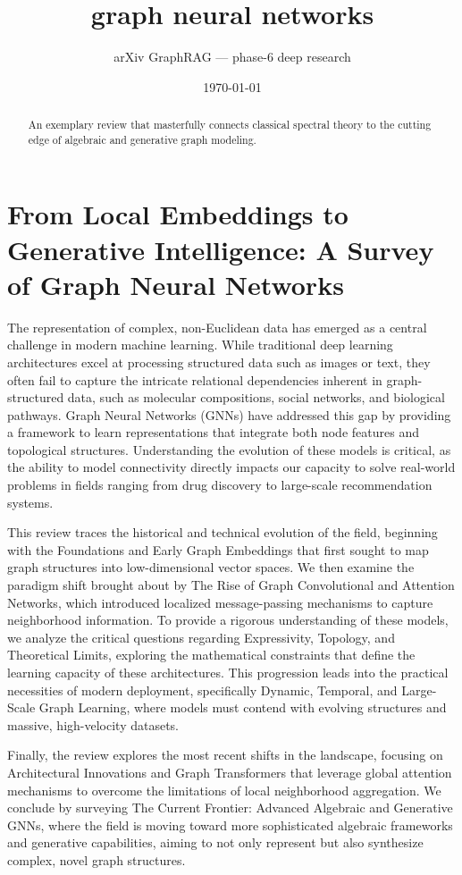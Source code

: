 \documentclass[11pt]{article}
\title{graph neural networks}
\author{arXiv GraphRAG --- phase-6 deep research}
\date{\today}
\begin{document}
\maketitle

\begin{abstract}
An exemplary review that masterfully connects classical spectral theory to the cutting edge of algebraic and generative graph modeling.
\end{abstract}

\section{From Local Embeddings to Generative Intelligence: A Survey of Graph Neural Networks}

The representation of complex, non-Euclidean data has emerged as a central challenge in modern machine learning. While traditional deep learning architectures excel at processing structured data such as images or text, they often fail to capture the intricate relational dependencies inherent in graph-structured data, such as molecular compositions, social networks, and biological pathways. Graph Neural Networks (GNNs) have addressed this gap by providing a framework to learn representations that integrate both node features and topological structures. Understanding the evolution of these models is critical, as the ability to model connectivity directly impacts our capacity to solve real-world problems in fields ranging from drug discovery to large-scale recommendation systems.

This review traces the historical and technical evolution of the field, beginning with the Foundations and Early Graph Embeddings that first sought to map graph structures into low-dimensional vector spaces. We then examine the paradigm shift brought about by The Rise of Graph Convolutional and Attention Networks, which introduced localized message-passing mechanisms to capture neighborhood information. To provide a rigorous understanding of these models, we analyze the critical questions regarding Expressivity, Topology, and Theoretical Limits, exploring the mathematical constraints that define the learning capacity of these architectures. This progression leads into the practical necessities of modern deployment, specifically Dynamic, Temporal, and Large-Scale Graph Learning, where models must contend with evolving structures and massive, high-velocity datasets.

Finally, the review explores the most recent shifts in the landscape, focusing on Architectural Innovations and Graph Transformers that leverage global attention mechanisms to overcome the limitations of local neighborhood aggregation. We conclude by surveying The Current Frontier: Advanced Algebraic and Generative GNNs, where the field is moving toward more sophisticated algebraic frameworks and generative capabilities, aiming to not only represent but also synthesize complex, novel graph structures.
\end{document}
